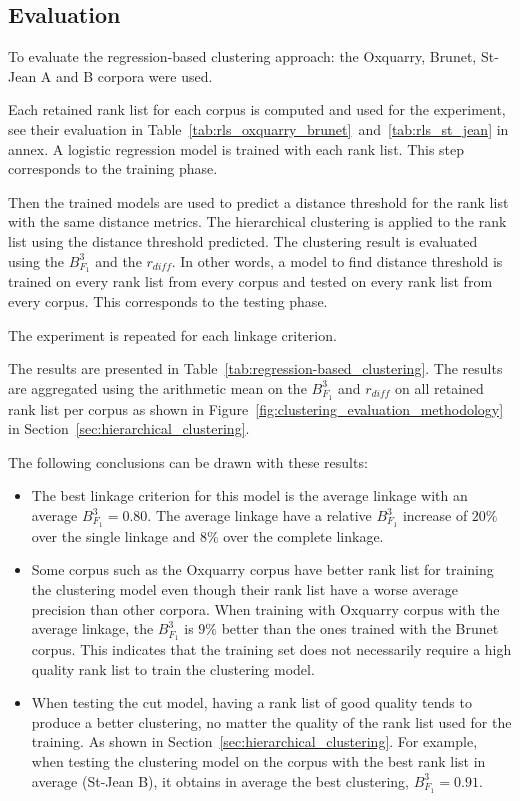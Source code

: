 \subsection{Evaluation}

To evaluate the regression-based clustering approach: the Oxquarry, Brunet, St-Jean A and B corpora were used.

Each retained rank list for each corpus is computed and used for the experiment, see their evaluation in Table~\ref{tab:rls_oxquarry_brunet}~and~\ref{tab:rls_st_jean} in annex.
A logistic regression model is trained with each rank list.
This step corresponds to the training phase.

Then the trained models are used to predict a distance threshold for the rank list with the same distance metrics.
The hierarchical clustering is applied to the rank list using the distance threshold predicted.
The clustering result is evaluated using the $B^3_{F_1}$ and the $r_{diff}$.
In other words, a model to find distance threshold is trained on every rank list from every corpus and tested on every rank list from every corpus.
This corresponds to the testing phase.

The experiment is repeated for each linkage criterion.

The results are presented in Table~\ref{tab:regression-based_clustering}.
The results are aggregated using the arithmetic mean on the $B^3_{F_1}$ and $r_{diff}$ on all retained rank list per corpus as shown in Figure~\ref{fig:clustering_evaluation_methodology} in Section~\ref{sec:hierarchical_clustering}.

The following conclusions can be drawn with these results:
\begin{itemize}
  \item
  The best linkage criterion for this model is the average linkage with an average $B^3_{F_1} = 0.80$.
  The average linkage have a relative $B^3_{F_1}$ increase of $20\%$ over the single linkage and $8\%$ over the complete linkage.
  \item
  Some corpus such as the Oxquarry corpus have better rank list for training the clustering model even though their rank list have a worse average precision than other corpora.
  When training with Oxquarry corpus with the average linkage, the $B^3_{F_1}$ is $9\%$ better than the ones trained with the Brunet corpus.
  This indicates that the training set does not necessarily require a high quality rank list to train the clustering model.
  \item
  When testing the cut model, having a rank list of good quality tends to produce a better clustering, no matter the quality of the rank list used for the training.
  As shown in Section~\ref{sec:hierarchical_clustering}.
  For example, when testing the clustering model on the corpus with the best rank list in average (St-Jean B), it obtains in average the best clustering, $B^3_{F_1} = 0.91$.
\end{itemize}

